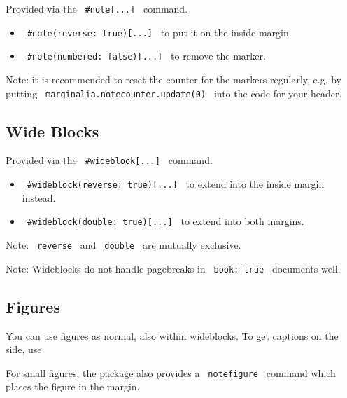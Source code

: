 Provided via the \texttt{\ \#note{[}...{]}\ } command.

\begin{itemize}
\tightlist
\item
  \texttt{\ \#note(reverse:\ true){[}...{]}\ } to put it on the inside
  margin.
\item
  \texttt{\ \#note(numbered:\ false){[}...{]}\ } to remove the marker.
\end{itemize}

Note: it is recommended to reset the counter for the markers regularly,
e.g. by putting \texttt{\ marginalia.notecounter.update(0)\ } into the
code for your header.

\subsection{Wide Blocks}\label{wide-blocks}

Provided via the \texttt{\ \#wideblock{[}...{]}\ } command.

\begin{itemize}
\tightlist
\item
  \texttt{\ \#wideblock(reverse:\ true){[}...{]}\ } to extend into the
  inside margin instead.
\item
  \texttt{\ \#wideblock(double:\ true){[}...{]}\ } to extend into both
  margins.
\end{itemize}

Note: \texttt{\ reverse\ } and \texttt{\ double\ } are mutually
exclusive.

Note: Wideblocks do not handle pagebreaks in \texttt{\ book:\ true\ }
documents well.

\subsection{Figures}\label{figures}

You can use figures as normal, also within wideblocks. To get captions
on the side, use

\begin{Shaded}
\begin{Highlighting}[]
\end{Highlighting}
\end{Shaded}

For small figures, the package also provides a \texttt{\ notefigure\ }
command which places the figure in the margin.

